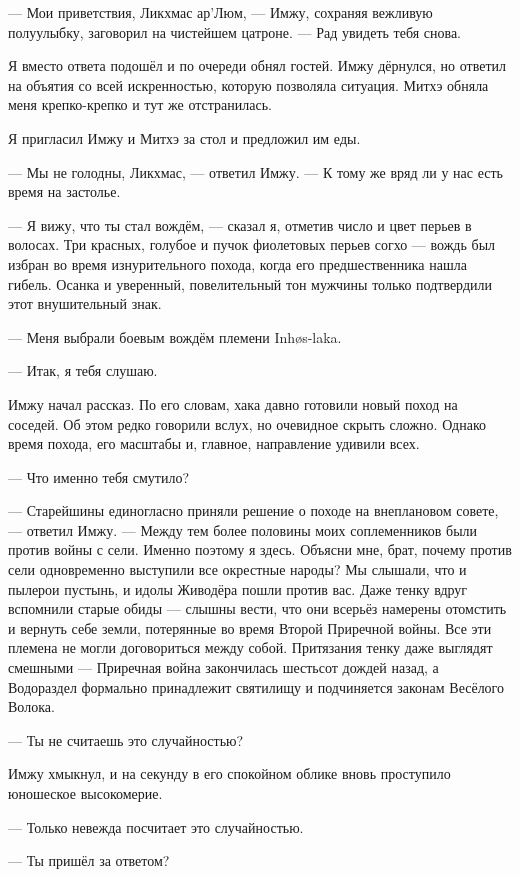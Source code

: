 --- Мои приветствия, Ликхмас ар’Люм, --- Имжу, сохраняя вежливую полуулыбку, заговорил на чистейшем цатроне.
--- Рад увидеть тебя снова.

Я вместо ответа подошёл и по очереди обнял гостей.
Имжу дёрнулся, но ответил на объятия со всей искренностью, которую позволяла ситуация.
Митхэ обняла меня крепко-крепко и тут же отстранилась.

Я пригласил Имжу и Митхэ за стол и предложил им еды.

--- Мы не голодны, Ликхмас, --- ответил Имжу.
--- К тому же вряд ли у нас есть время на застолье.

--- Я вижу, что ты стал вождём, --- сказал я, отметив число и цвет перьев в волосах.
Три красных, голубое и пучок фиолетовых перьев согхо --- вождь был избран во время изнурительного похода, когда его предшественника нашла гибель.
Осанка и уверенный, повелительный тон мужчины только подтвердили этот внушительный знак.

--- Меня выбрали боевым вождём племени Inh\o s-laka\FM.

--- Итак, я тебя слушаю.

Имжу начал рассказ.
По его словам, хака давно готовили новый поход на соседей.
Об этом редко говорили вслух, но очевидное скрыть сложно.
Однако время похода, его масштабы и, главное, направление удивили всех.

--- Что именно тебя смутило?

--- Старейшины единогласно приняли решение о походе на внеплановом совете, --- ответил Имжу.
--- Между тем более половины моих соплеменников были против войны с сели.
Именно поэтому я здесь.
Объясни мне, брат, почему против сели одновременно выступили все окрестные народы?
Мы слышали, что и пылерои пустынь, и идолы Живодёра пошли против вас.
Даже тенку вдруг вспомнили старые обиды --- слышны вести, что они всерьёз намерены отомстить и вернуть себе земли, потерянные во время Второй Приречной войны.
Все эти племена не могли договориться между собой.
Притязания тенку даже выглядят смешными --- Приречная война закончилась шестьсот дождей назад, а Водораздел формально принадлежит святилищу и подчиняется законам Весёлого Волока.

--- Ты не считаешь это случайностью?

Имжу хмыкнул, и на секунду в его спокойном облике вновь проступило юношеское высокомерие.

--- Только невежда посчитает это случайностью.

--- Ты пришёл за ответом?

